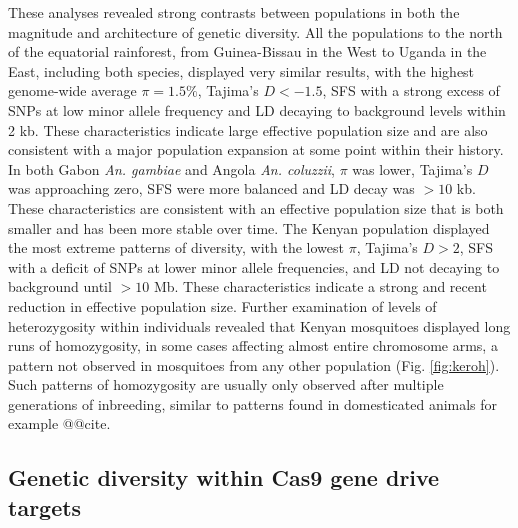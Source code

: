 \documentclass[a4paper,11pt,abstracton,hidelinks]{scrartcl}
\begin{document}
These analyses revealed strong contrasts between populations in both the magnitude and architecture of genetic diversity.
%
All the populations to the north of the equatorial rainforest, from Guinea-Bissau in the West to Uganda in the East, including both species, displayed very similar results, with the highest genome-wide average $\pi = 1.5\%$, Tajima's $D < -1.5$, SFS with a strong excess of SNPs at low minor allele frequency and LD decaying to background levels within 2 kb.
%
These characteristics indicate large effective population size and are also consistent with a major population expansion at some point within their history.
%
In both Gabon \textit{An. gambiae} and Angola \textit{An. coluzzii}, $\pi$ was lower, Tajima's $D$ was approaching zero, SFS were more balanced and LD decay was $> 10$ kb.
%
These characteristics are consistent with an effective population size that is both smaller and has been more stable over time.
%
The Kenyan population displayed the most extreme patterns of diversity, with the lowest $\pi$, Tajima's $D > 2$, SFS with a deficit of SNPs at lower minor allele frequencies, and LD not decaying to background until $> 10$ Mb.
%
These characteristics indicate a strong and recent reduction in effective population size.
%
Further examination of levels of heterozygosity within individuals revealed that Kenyan mosquitoes displayed long runs of homozygosity, in some cases affecting almost entire chromosome arms, a pattern not observed in mosquitoes from any other population (Fig. \ref{fig:keroh}).
%
Such patterns of homozygosity are usually only observed after multiple generations of inbreeding, similar to patterns found in domesticated animals for example @@cite.


\subsection{Genetic diversity within Cas9 gene drive targets}\label{subsec:gene-drive}
\end{document}
